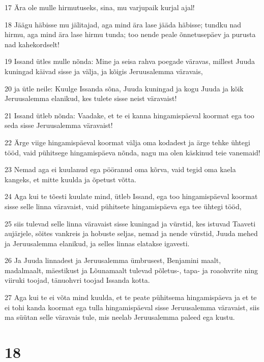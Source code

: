 \par 17 Ära ole mulle hirmutuseks, sina, mu varjupaik kurjal ajal!
\par 18 Jäägu häbisse mu jälitajad, aga mind ära lase jääda häbisse; tundku nad hirmu, aga mind ära lase hirmu tunda; too nende peale õnnetusepäev ja purusta nad kahekordselt!
\par 19 Issand ütles mulle nõnda: Mine ja seisa rahva poegade väravas, millest Juuda kuningad käivad sisse ja välja, ja kõigis Jeruusalemma väravais,
\par 20 ja ütle neile: Kuulge Issanda sõna, Juuda kuningad ja kogu Juuda ja kõik Jeruusalemma elanikud, kes tulete sisse neist väravaist!
\par 21 Issand ütleb nõnda: Vaadake, et te ei kanna hingamispäeval koormat ega too seda sisse Jeruusalemma väravaist!
\par 22 Ärge viige hingamispäeval koormat välja oma kodadest ja ärge tehke ühtegi tööd, vaid pühitsege hingamispäeva nõnda, nagu ma olen käskinud teie vanemaid!
\par 23 Nemad aga ei kuulanud ega pööranud oma kõrva, vaid tegid oma kaela kangeks, et mitte kuulda ja õpetust võtta.
\par 24 Aga kui te tõesti kuulate mind, ütleb Issand, ega too hingamispäeval koormat sisse selle linna väravaist, vaid pühitsete hingamispäeva ega tee ühtegi tööd,
\par 25 siis tulevad selle linna väravaist sisse kuningad ja vürstid, kes istuvad Taaveti aujärjele, sõites vankreis ja hobuste seljas, nemad ja nende vürstid, Juuda mehed ja Jeruusalemma elanikud, ja selles linnas elatakse igavesti.
\par 26 Ja Juuda linnadest ja Jeruusalemma ümbrusest, Benjamini maalt, madalmaalt, mäestikust ja Lõunamaalt tulevad põletus-, tapa- ja roaohvrite ning viiruki toojad, tänuohvri toojad Issanda kotta.
\par 27 Aga kui te ei võta mind kuulda, et te peate pühitsema hingamispäeva ja et te ei tohi kanda koormat ega tulla hingamispäeval sisse Jeruusalemma väravaist, siis ma süütan selle väravais tule, mis neelab Jeruusalemma paleed ega kustu.

\chapter{18}

